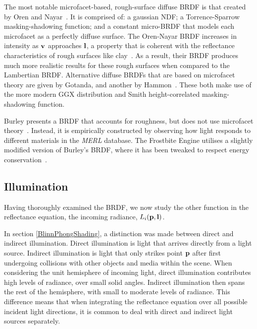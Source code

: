 The most notable microfacet-based, rough-surface diffuse BRDF is that created by Oren and Nayar~\cite{OrenAndNayar}. It is comprised of: a gaussian NDF; a Torrence-Sparrow masking-shadowing function; and a constant micro-BRDF that models each microfacet as a perfectly diffuse surface. The Oren-Nayar BRDF increases in intensity as \begin{math}\mathbf{v}\end{math} approaches \begin{math}\mathbf{l}\end{math}, a property that is coherent with the reflectance characteristics of rough surfaces like clay~\cite{OrenAndNayar}. As a result, their BRDF produces much more realistic results for these rough surfaces when compared to the Lambertian BRDF. Alternative diffuse BRDFs that are based on microfacet theory are given by Gotanda, and another by Hammon~\cite{GotandaDiffuseBRDF}\cite{HammonBRDF}. These both make use of the more modern GGX distribution and Smith height-correlated masking-shadowing function.

Burley presents a BRDF that accounts for roughness, but does not use microfacet theory~\cite{Burley2012Physically}. Instead, it is empirically constructed by observing how light responds to different materials in the \textit{MERL} database. The Frostbite Engine utilises a slightly modified version of Burley's BRDF, where it has been tweaked to respect energy conservation~\cite{MovingFrostbitetoPBR}.

\subsection{Illumination} \label{Illumination}

Having thoroughly examined the BRDF, we now study the other function in the reflectance equation, the incoming radiance, \begin{math}L_i(\mathbf{p}, \mathbf{l})\end{math}.

In section \ref{BlinnPhongShading}, a distinction was made between direct and indirect illumination. Direct illumination is light that arrives directly from a light source. Indirect illumination is light that only strikes point \begin{math}\mathbf{p}\end{math} after first undergoing collisions with other objects and media within the scene. When considering the unit hemisphere of incoming light, direct illumination contributes high levels of radiance, over small solid angles. Indirect illumination then spans the rest of the hemisphere, with small to moderate levels of radiance. This difference means that when integrating the reflectance equation over all possible incident light directions, it is common to deal with direct and indirect light sources separately.

